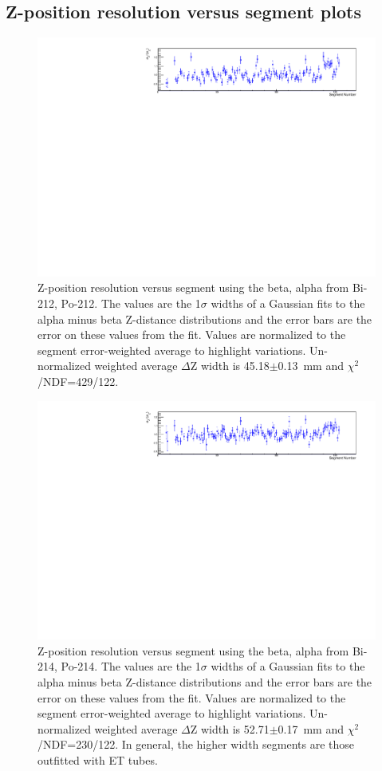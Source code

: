 \subsection{Z-position resolution versus segment plots}
\begin{figure}[!h]
\centering
\includegraphics[width=1.05\textwidth]{figures/PubBiPo212dZWidthvsCell.pdf}
\caption{\label{fig:ZresvsCell212}Z-position resolution versus segment using the beta, alpha from Bi-212, Po-212. The values are the 1$\sigma$ widths of a Gaussian fits to the alpha minus beta Z-distance distributions and the error bars are the error on these values from the fit. Values are normalized to the segment error-weighted average to highlight variations. Un-normalized weighted average $\Delta$Z width is 45.18$\pm$0.13~mm and $\chi^2$/NDF=429/122.}
\end{figure}
\begin{figure}[!h]
\centering
\includegraphics[width=1.05\textwidth]{figures/PubBiPo214dZWidthvsCell.pdf}
\caption{\label{fig:ZresvsCell214}Z-position resolution versus segment using the beta, alpha from Bi-214, Po-214. The values are the 1$\sigma$ widths of a Gaussian fits to the alpha minus beta Z-distance distributions and the error bars are the error on these values from the fit. Values are normalized to the segment error-weighted average to highlight variations. Un-normalized weighted average $\Delta$Z width is 52.71$\pm$0.17~mm and $\chi^2$/NDF=230/122. In general, the higher width segments are those outfitted with ET tubes.}
\end{figure}
